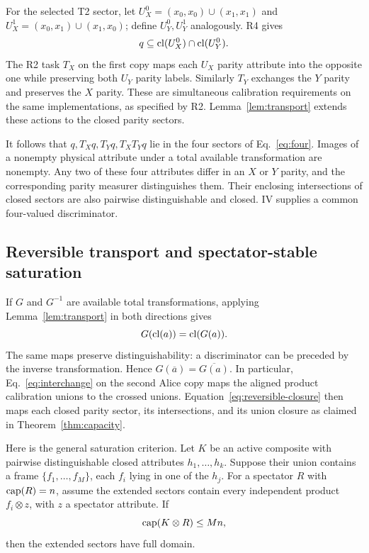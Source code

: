 For the selected T2 sector, let $U_X^0=(x_0,x_0)\cup(x_1,x_1)$ and $U_X^1=(x_0,x_1)\cup(x_1,x_0)$; define $U_Y^0,U_Y^1$ analogously. R4 gives
\begin{equation}\label{eq:R4}
 q\subseteq\cl(U_X^0)\cap\cl(U_Y^0).
\end{equation}
The R2 task $T_X$ on the first copy maps each $U_X$ parity attribute into the opposite one while preserving both $U_Y$ parity labels. Similarly $T_Y$ exchanges the $Y$ parity and preserves the $X$ parity. These are simultaneous calibration requirements on the same implementations, as specified by R2. Lemma~\ref{lem:transport} extends these actions to the closed parity sectors.

It follows that $q,T_Xq,T_Yq,T_XT_Yq$ lie in the four sectors of Eq.~\eqref{eq:four}. Images of a nonempty physical attribute under a total available transformation are nonempty. Any two of these four attributes differ in an $X$ or $Y$ parity, and the corresponding parity measurer distinguishes them. Their enclosing intersections of closed sectors are also pairwise distinguishable and closed. IV supplies a common four-valued discriminator.

\subsection{Reversible transport and spectator-stable saturation}
If $G$ and $G^{-1}$ are available total transformations, applying Lemma~\ref{lem:transport} in both directions gives
\begin{equation}\label{eq:reversible-closure}
 G(\cl(a))=\cl(G(a)).
\end{equation}
The same maps preserve distinguishability: a discriminator can be preceded by the inverse transformation. Hence $G(\overline a)=\overline{G(a)}$. In particular, Eq.~\eqref{eq:interchange} on the second Alice copy maps the aligned product calibration unions to the crossed unions. Equation~\eqref{eq:reversible-closure} then maps each closed parity sector, its intersections, and its union closure as claimed in Theorem~\ref{thm:capacity}.

Here is the general saturation criterion. Let $K$ be an active composite with pairwise distinguishable closed attributes $h_1,\ldots,h_k$. Suppose their union contains a frame $\{f_1,\ldots,f_M\}$, each $f_i$ lying in one of the $h_j$. For a spectator $R$ with $\operatorname{cap}(R)=n$, assume the extended sectors contain every independent product $f_i\otimes z$, with $z$ a spectator attribute. If
\begin{equation}\label{eq:general-capacity}
 \capn(K\otimes R)\leq Mn,
\end{equation}
then the extended sectors have full domain.

